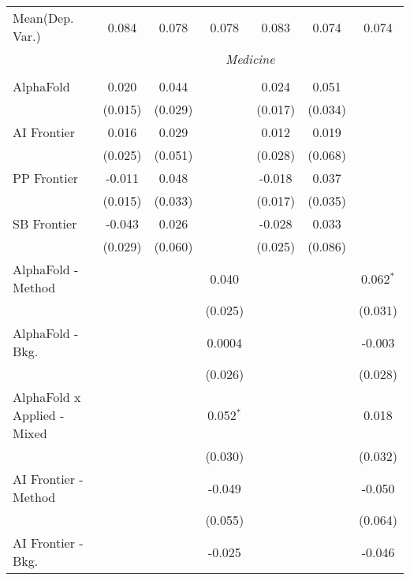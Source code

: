 \begin{tabular}{lcccccc}
Mean(Dep. Var.) & 0.084 & 0.078 & 0.078 & 0.083 & 0.074 & 0.074 \\
 & \multicolumn{6}{c}{\textit{Medicine}} \\ \\
   AlphaFold                   & 0.020   & 0.044   &                & 0.024   & 0.051   &   \\   
                               & (0.015) & (0.029) &                & (0.017) & (0.034) &   \\   
   AI Frontier                 & 0.016   & 0.029   &                & 0.012   & 0.019   &   \\   
                               & (0.025) & (0.051) &                & (0.028) & (0.068) &   \\   
   PP Frontier                 & -0.011  & 0.048   &                & -0.018  & 0.037   &   \\   
                               & (0.015) & (0.033) &                & (0.017) & (0.035) &   \\   
   SB Frontier                 & -0.043  & 0.026   &                & -0.028  & 0.033   &   \\   
                               & (0.029) & (0.060) &                & (0.025) & (0.086) &   \\   
   AlphaFold - Method          &         &         & 0.040          &         &         & 0.062$^{*}$\\   
                               &         &         & (0.025)        &         &         & (0.031)\\   
   AlphaFold - Bkg.            &         &         & 0.0004         &         &         & -0.003\\   
                               &         &         & (0.026)        &         &         & (0.028)\\   
   AlphaFold x Applied - Mixed &         &         & 0.052$^{*}$    &         &         & 0.018\\   
                               &         &         & (0.030)        &         &         & (0.032)\\   
   AI Frontier - Method        &         &         & -0.049         &         &         & -0.050\\   
                               &         &         & (0.055)        &         &         & (0.064)\\   
   AI Frontier - Bkg.          &         &         & -0.025         &         &         & -0.046\\   

\end{tabular}
